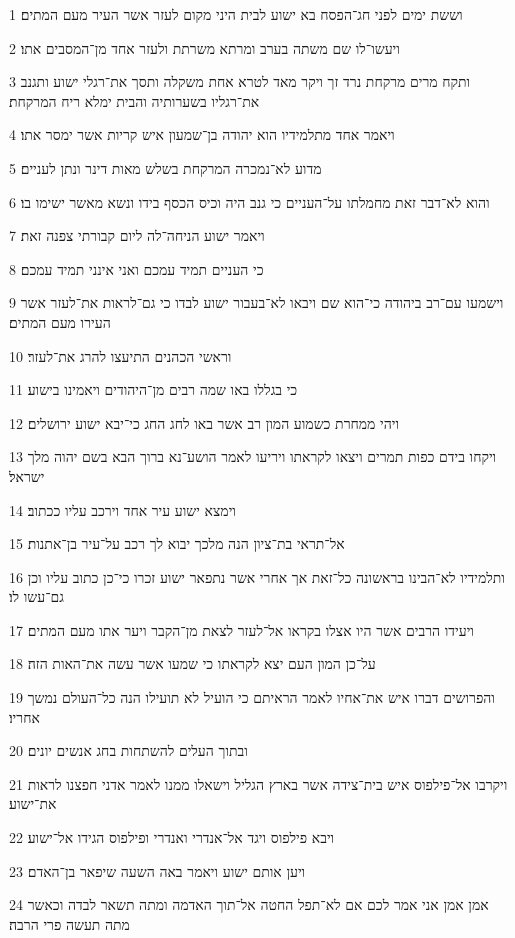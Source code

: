 \par 1 וששת ימים לפני חג־הפסח בא ישוע לבית היני מקום לעזר אשר העיר מעם המתים׃
\par 2 ויעשו־לו שם משתה בערב ומרתא משרתת ולעזר אחד מן־המסבים אתו׃
\par 3 ותקח מרים מרקחת נרד זך ויקר מאד לטרא אחת משקלה ותסך את־רגלי ישוע ותגנב את־רגליו בשערותיה והבית ימלא ריח המרקחת׃
\par 4 ויאמר אחד מתלמידיו הוא יהודה בן־שמעון איש קריות אשר ימסר אתו׃
\par 5 מדוע לא־נמכרה המרקחת בשלש מאות דינר ונתן לעניים׃
\par 6 והוא לא־דבר זאת מחמלתו על־העניים כי גנב היה וכיס הכסף בידו ונשא מאשר ישימו בו׃
\par 7 ויאמר ישוע הניחה־לה ליום קבורתי צפנה זאת׃
\par 8 כי העניים תמיד עמכם ואני אינני תמיד עמכם׃
\par 9 וישמעו עם־רב ביהודה כי־הוא שם ויבאו לא־בעבור ישוע לבדו כי גם־לראות את־לעזר אשר העירו מעם המתים׃
\par 10 וראשי הכהנים התיעצו להרג את־לעזר׃
\par 11 כי בגללו באו שמה רבים מן־היהודים ויאמינו בישוע׃
\par 12 ויהי ממחרת כשמוע המון רב אשר באו לחג החג כי־יבא ישוע ירושלים׃
\par 13 ויקחו בידם כפות תמרים ויצאו לקראתו ויריעו לאמר הושע־נא ברוך הבא בשם יהוה מלך ישראל׃
\par 14 וימצא ישוע עיר אחד וירכב עליו ככתוב׃
\par 15 אל־תראי בת־ציון הנה מלכך יבוא לך רכב על־עיר בן־אתנות׃
\par 16 ותלמידיו לא־הבינו בראשונה כל־זאת אך אחרי אשר נתפאר ישוע זכרו כי־כן כתוב עליו וכן גם־עשו לו׃
\par 17 ויעידו הרבים אשר היו אצלו בקראו אל־לעזר לצאת מן־הקבר ויער אתו מעם המתים׃
\par 18 על־כן המון העם יצא לקראתו כי שמעו אשר עשה את־האות הזה׃
\par 19 והפרושים דברו איש את־אחיו לאמר הראיתם כי הועיל לא תועילו הנה כל־העולם נמשך אחריו׃
\par 20 ובתוך העלים להשתחות בחג אנשים יונים׃
\par 21 ויקרבו אל־פילפוס איש בית־צידה אשר בארץ הגליל וישאלו ממנו לאמר אדני חפצנו לראות את־ישוע׃
\par 22 ויבא פילפוס ויגד אל־אנדרי ואנדרי ופילפוס הגידו אל־ישוע׃
\par 23 ויען אותם ישוע ויאמר באה השעה שיפאר בן־האדם׃
\par 24 אמן אמן אני אמר לכם אם לא־תפל החטה אל־תוך האדמה ומתה תשאר לבדה וכאשר מתה תעשה פרי הרבה׃
